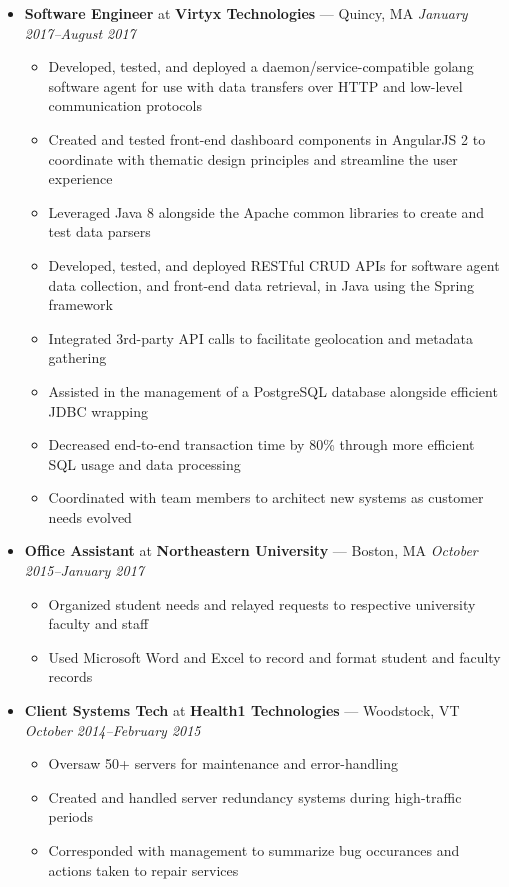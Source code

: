 \documentclass{article}
\begin{document}
\begin{itemize}[label={},leftmargin=*]
\item \textbf{Software Engineer} at \textbf{Virtyx Technologies} --- Quincy, MA \hfill {\em January 2017--August 2017}
  \begin{itemize}[label={$\bullet$}]
  \item Developed, tested, and deployed a daemon/service-compatible golang software agent for use with data transfers over HTTP and low-level communication protocols
  \item Created and tested front-end dashboard components in AngularJS 2 to coordinate with thematic design principles and streamline the user experience
  \item Leveraged Java 8 alongside the Apache common libraries to create and test data parsers
  \item Developed, tested, and deployed RESTful CRUD APIs for software agent data collection, and front-end data retrieval, in Java using the Spring framework
  \item Integrated 3rd-party API calls to facilitate geolocation and metadata gathering
  \item Assisted in the management of a PostgreSQL database alongside efficient JDBC wrapping
  \item Decreased end-to-end transaction time by 80\% through more efficient SQL usage and data processing
  \item Coordinated with team members to architect new systems as customer needs evolved
  \end{itemize}

\item \textbf{Office Assistant} at \textbf{Northeastern University} --- Boston, MA \hfill {\em October 2015--January 2017}
  \begin{itemize}[label={$\bullet$}]
  \item Organized student needs and relayed requests to respective university faculty and staff
  \item Used Microsoft Word and Excel to record and format student and faculty records
  \end{itemize}

\item \textbf{Client Systems Tech} at \textbf{Health1 Technologies} --- Woodstock, VT \hfill {\em October 2014--February 2015}
  \begin{itemize}[label={$\bullet$}]
  \item Oversaw 50+ servers for maintenance and error-handling
  \item Created and handled server redundancy systems during high-traffic periods
  \item Corresponded with management to summarize bug occurances and actions taken to repair services
  \end{itemize}
\end{itemize}
\end{document}
